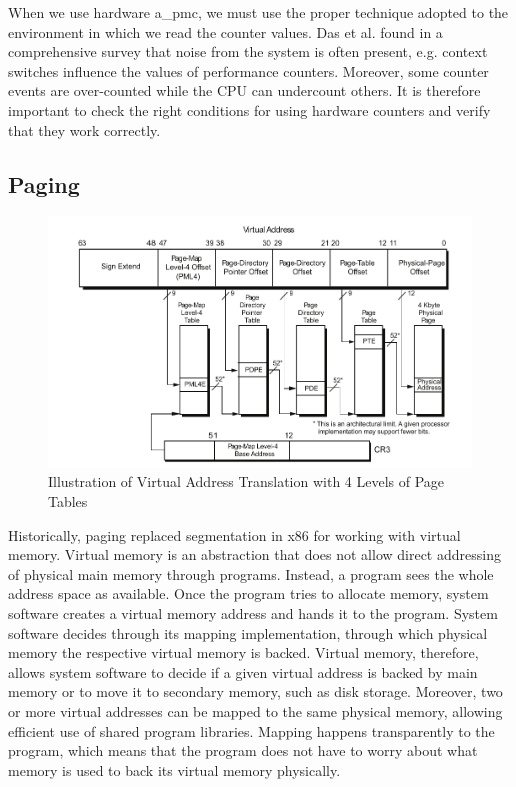 When we use hardware \acrshort{a_pmc}, we must use the proper
technique adopted to the environment in which we read the counter values. Das et
al. found in a comprehensive survey that noise from the system is often present,
e.g. context switches influence the values of performance counters.
\cite{das_sok_2019} Moreover, some counter events are over-counted while the CPU
can undercount others.\cite{weaver_non-determinism_2013} It is therefore
important to check the right conditions for using hardware counters and verify
that they work correctly.

\subsection{Paging}
\label{sec:state:technical:paging}
\begin{center}
    \begin{figure}
        \includegraphics[width=\textwidth]{images/paging_placeholder.png}
        \caption{Illustration of Virtual Address Translation with 4 Levels of Page Tables}
        \label{fig:state:technical:paging}
    \end{figure}
\end{center}

Historically, paging replaced segmentation in x86 for working with virtual
memory. Virtual memory is an abstraction that does not allow direct addressing
of physical main memory through programs. Instead, a program sees the whole
address space as available. Once the program tries to allocate memory, system
software creates a virtual memory address and hands it to the program. System
software decides through its mapping implementation, through which physical
memory the respective virtual memory is backed. Virtual memory, therefore,
allows system software to decide if a given virtual address is backed by main
memory or to move it to secondary memory, such as disk storage. Moreover, two
or more virtual addresses can be mapped to the same physical memory, allowing
efficient use of shared program libraries. Mapping happens transparently to the
program, which means that the program does not have to worry about what memory
is used to back its virtual memory physically.\\

